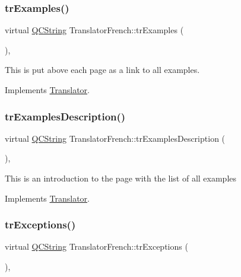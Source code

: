 \subsubsection{\texorpdfstring{trExamples()}{trExamples()}}
{\footnotesize\ttfamily virtual \mbox{\hyperlink{class_q_c_string}{Q\+C\+String}} Translator\+French\+::tr\+Examples (\begin{DoxyParamCaption}{ }\end{DoxyParamCaption})\hspace{0.3cm}{\ttfamily [inline]}, {\ttfamily [virtual]}}

This is put above each page as a link to all examples. 

Implements \mbox{\hyperlink{class_translator}{Translator}}.

\mbox{\label{class_translator_french_a9b1d0d51a050d454abb082d38be5c321}} 
\subsubsection{\texorpdfstring{trExamplesDescription()}{trExamplesDescription()}}
{\footnotesize\ttfamily virtual \mbox{\hyperlink{class_q_c_string}{Q\+C\+String}} Translator\+French\+::tr\+Examples\+Description (\begin{DoxyParamCaption}{ }\end{DoxyParamCaption})\hspace{0.3cm}{\ttfamily [inline]}, {\ttfamily [virtual]}}

This is an introduction to the page with the list of all examples 

Implements \mbox{\hyperlink{class_translator}{Translator}}.

\mbox{\label{class_translator_french_ab07cd3e3b91465ec734bc5b00221f29b}} 
\subsubsection{\texorpdfstring{trExceptions()}{trExceptions()}}
{\footnotesize\ttfamily virtual \mbox{\hyperlink{class_q_c_string}{Q\+C\+String}} Translator\+French\+::tr\+Exceptions (\begin{DoxyParamCaption}{ }\end{DoxyParamCaption})\hspace{0.3cm}{\ttfamily [inline]}, {\ttfamily [virtual]}}


